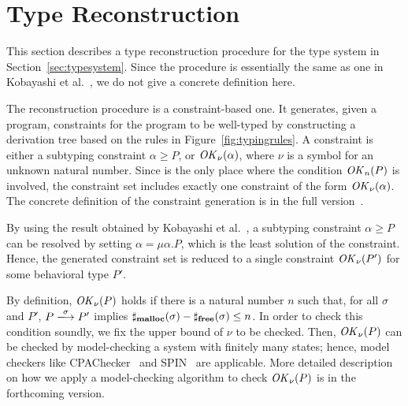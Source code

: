 \section{Type Reconstruction}\label{sec:reconstruction}

This section describes a type reconstruction procedure for the type
system in Section~\ref{sec:typesystem}.  Since the procedure is
essentially the same as one in Kobayashi et
al.~\cite{DBLP:journals/lmcs/KobayashiSW06}, we do not give a concrete
definition here.


The reconstruction procedure is a constraint-based one.  It generates,
given a program, constraints for the program to be well-typed by
constructing a derivation tree based on the rules in
Figure~\ref{fig:typingrules}.  A constraint is either a subtyping
constraint \(\alpha \ge P\), or \(\mathit{OK}_\nu(\alpha)\), where \(\nu\) is
a symbol for an unknown natural number.  Since  is the only
place where the condition \(\mathit{OK}_n(P)\) is involved, the constraint set
includes exactly one constraint of the form \(\mathit{OK}_\nu(\alpha)\).  The
concrete definition of the constraint generation is in the full
version~\cite{fullversion}.

By using the result obtained by Kobayashi et al.~\cite[Lemma
  3.8]{DBLP:journals/lmcs/KobayashiSW06}, a subtyping constraint
\(\alpha \ge P\) can be resolved by setting \(\alpha = \mu
\alpha. P\), which is the least solution of the constraint.  Hence,
the generated constraint set is reduced to a single constraint
\(\mathit{OK}_{\nu}(P')\) for some behavioral type \(P'\).

By definition, \(\mathit{OK}_{\nu}(P)\) holds if there is a natural number
\(n\) such that, for all \(\sigma\) and \(P'\), \(P
\xlongrightarrow{\sigma} P'\) implies \(\sharp_{\mathbf{malloc}}(\sigma) -
\sharp_{\mathbf{free}}(\sigma) \le n\).  In order to check this condition
soundly, we fix the upper bound of \(\nu\) to be checked.  Then,
\(\mathit{OK}_{\nu}(P)\) can be checked by model-checking a system with
finitely many states; hence, model checkers like
CPAChecker~\cite{beyer2011cpachecker} and
SPIN~\cite{holzmann2004spin,ben2008principles} are
applicable.  More detailed description on how we apply a
model-checking algorithm to check \(\mathit{OK}_\nu(P)\) is in the forthcoming
version.
